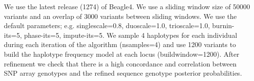 We use the latest release (1274) of Beagle4. We use a sliding window size of 50000 variants and an overlap of 3000 variants between sliding windows. We use the default parameters; e.g. singlescale=0.8, duoscale=1.0, trioscale=1.0, burnin-its=5, phase-its=5, impute-its=5. We sample 4 haplotypes for each individual during each iteration of the algorithm (nsamples=4) and use 1200 variants to build the haplotype frequency model at each locus (buildwindow=1200). After refinement we check that there is a high concordance and correlation between SNP array genotypes and the refined sequence genotype posterior probabilities.


